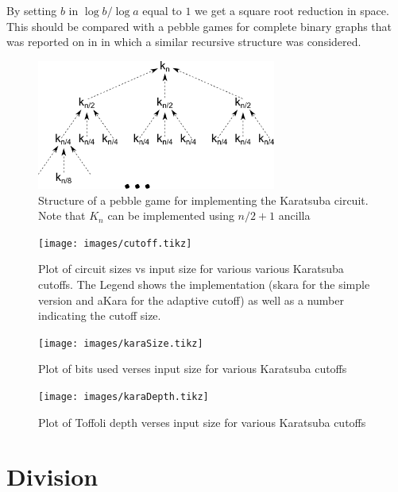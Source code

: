 By setting $b$ in $\log b / \log a$ equal to $1$ we get a square root
reduction in space. This should be compared with a pebble games for complete
binary graphs that was reported on in \cite{peb16} in which a similar
recursive structure was considered.



      \begin{figure}[p]
        \capstart
        \centering
        \includegraphics[width=0.7\textwidth]{images/kara-mdd}
        \caption{Structure of a pebble game for implementing the Karatsuba circuit. Note that $K_n$ can be implemented using $n/2+1$ ancilla}
        \label{fig:kara-mdd}
      \end{figure}

     \begin{figure}[p]
        \capstart
        \texttt{[image: images/cutoff.tikz]}
        \caption{Plot of circuit sizes vs input size for various various Karatsuba cutoffs.
                 The Legend shows the implementation (skara for the simple version and aKara for the adaptive cutoff) as well as a number indicating the cutoff size. }
        \label{fig:cutoff}
      \end{figure}

      \begin{figure}[p]
        \capstart
        \texttt{[image: images/karaSize.tikz]}
        \caption{Plot of bits used verses input size for various Karatsuba cutoffs}
        \label{fig:size}
      \end{figure}
      \begin{figure}[p]
        \capstart
        \texttt{[image: images/karaDepth.tikz]}
        \caption{Plot of Toffoli depth verses input size for various Karatsuba cutoffs}
        \label{fig:depth}
      \end{figure}

\section{Division}
